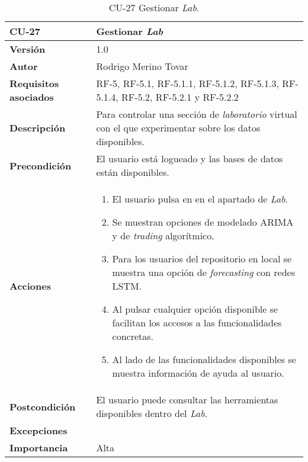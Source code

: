 \begin{table}[p]
	\centering
	\begin{tabularx}{\linewidth}{ p{} p{} }
		\toprule
		\textbf{CU-27}    & \textbf{Gestionar \emph{Lab}}\\
		\toprule
		\textbf{Versión}              & 1.0    \\
		\textbf{Autor}                & Rodrigo Merino Tovar \\
		\textbf{Requisitos asociados} & RF-5, RF-5.1, RF-5.1.1, RF-5.1.2, RF-5.1.3, RF-5.1.4, RF-5.2, RF-5.2.1 y RF-5.2.2 \\
		\textbf{Descripción}          & Para controlar una sección de \emph{laboratorio} virtual con el que experimentar sobre los datos disponibles.\\
		\textbf{Precondición}         & El usuario está logueado y las bases de datos están disponibles.  \\
		\textbf{Acciones}             &
		\begin{enumerate}
			\def\labelenumi{\arabic{enumi}.}
			\tightlist 
			\item El usuario pulsa en en el apartado de \emph{Lab}.
			\item Se muestran opciones de modelado ARIMA y de \emph{trading} algorítmico.
			\item Para los usuarios del repositorio en local se muestra una opción de \emph{forecasting} con redes LSTM.
			\item Al pulsar cualquier opción disponible se facilitan los accesos a las funcionalidades concretas.
			\item Al lado de las funcionalidades disponibles se muestra información de ayuda al usuario.  
		\end{enumerate}\\
		\textbf{Postcondición}        & El usuario puede consultar las herramientas disponibles dentro del \emph{Lab}. \\
		\textbf{Excepciones}          & \\
		\textbf{Importancia}          & Alta \\
		\bottomrule
	\end{tabularx}
	\caption{CU-27 Gestionar \emph{Lab}.}
\end{table}


